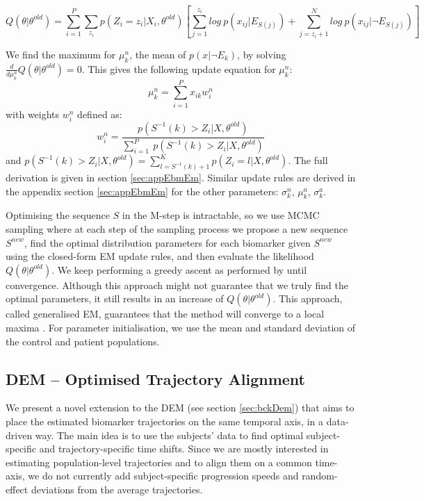 \begin{equation}
Q(\theta | \theta^{old}) = \sum_{i=1}^P \sum_{z_i} p(Z_i = z_i|X_i, \theta^{old}) \left[ \sum_{j=1}^{z_i} log\ p(x_{ij}|E_{S(j)}) + \sum_{j=z_i + 1}^N log\ p(x_{ij}| \neg E_{S(j)}) \right]
\end{equation}

We find the maximum for $\mu_k^n$, the mean of $p(x|\neg E_k)$, by solving $\frac{d}{d\mu_k^n}Q(\theta | \theta^{old}) = 0 $. This gives the following update equation for $\mu_k^n$:
\begin{equation}
 \mu_k^n = \sum_{i=1}^P x_{ik} w_i^n
\end{equation}
with weights $w_i^n$ defined as:
\begin{equation}
w_i^n = \frac{p(S^{-1}(k) > Z_i | X, \theta^{old})}{\sum_{i=1}^P \ p(S^{-1}(k) > Z_i | X, \theta^{old})}
\end{equation}
and $p(S^{-1}(k) > Z_i | X, \theta^{old}) = \sum_{l=S^{-1}(k)+1}^{K} p(Z_i = l | X, \theta^{old})$. The full derivation is given in section \ref{sec:appEbmEm}. Similar update rules are derived in the appendix section \ref{sec:appEbmEm} for the other parameters: $\sigma_k^n$, $\mu_k^a$, $\sigma_k^a$. 

Optimising the sequence $S$ in the M-step is intractable, so we use MCMC sampling where at each step of the sampling process we propose a new sequence $S^{new}$, find the optimal distribution parameters for each biomarker given $S^{new}$ using the closed-form EM update rules, and then evaluate the likelihood $Q(\theta | \theta^{old})$. We keep performing a greedy ascent as performed by \cite{fonteijn2012event} until convergence. Although this approach might not guarantee that we truly find the optimal parameters, it still results in an increase of $Q(\theta | \theta^{old})$. This approach, called generalised EM, guarantees that the method will converge to a local maxima \cite{bishop2007pattern}. For parameter initialisation, we use the mean and standard deviation of the control and patient populations. 

\subsection{DEM -- Optimised Trajectory Alignment}
\label{sec:demOptim}

We present a novel extension to the DEM (see section \ref{sec:bckDem}) that aims to place the estimated biomarker trajectories on the same temporal axis, in a data-driven way. The main idea is to use the subjects' data to find optimal subject-specific and trajectory-specific time shifts. Since we are mostly interested in estimating population-level trajectories and to align them on a common time-axis, we do not currently add subject-specific progression speeds and random-effect deviations from the average trajectories.


